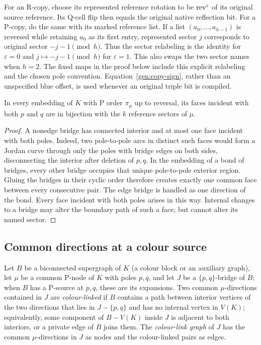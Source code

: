 For an R-copy, choose its represented reference rotation to be
$\operatorname{rev}^{\varepsilon}$ of its original source reference.  Its Q-cell flip
then equals the original native reflection bit.  For a P-copy, do the
same with its marked reference list.  If a list
$(a_0,\ldots,a_{h-1})$ is reversed while retaining $a_0$ as its first
entry, represented sector $j$ corresponds to original sector
$-j-1\pmod h$.  Thus the sector relabeling is the identity for
$\varepsilon=0$ and $j\mapsto-j-1\pmod h$ for $\varepsilon=1$.
This also swaps the two sector names when $h=2$.  The fixed maps in the
proof below include this explicit relabeling and the chosen pole
convention.  Equation~\eqref{gen:copy-sign}, rather than an unspecified
blue offset, is used whenever an original triple bit is compiled.

\begin{lemma}
\label{gen:p-faces}
In every embedding of $K$ with P order $\pi_\mu$ up to reversal, its
faces incident with both $p$ and $q$ are in bijection with the $k$ reference
sectors of $\mu$.
\end{lemma}

\begin{proof}
A nonedge bridge has connected interior and at most one face incident with
both poles.  Indeed, two pole-to-pole arcs in distinct such faces would
form a Jordan curve through only the poles with bridge edges on both
sides, disconnecting the interior after deletion of $p,q$.  In the
embedding of a bond of bridges, every other bridge occupies that unique
pole-to-pole exterior region.  Gluing the bridges in their cyclic order
therefore creates exactly one common face between every consecutive pair.
The edge bridge is handled as one direction of the bond.  Every face
incident with both poles arises in this way.  Internal changes to a bridge
may alter the boundary path of such a face, but cannot alter its named
sector.
\end{proof}

\subsection{Common directions at a colour source}

Let $B$ be a biconnected supergraph of $K$ (a colour block or an auxiliary
graph), let $\mu$ be a common P-node of $K$ with poles $p,q$, and let $J$
be a $\{p,q\}$-bridge of $B$; when $B$ has a P-source at $p,q$, these are
its expansions.  Two common $\mu$-directions contained in $J$ are
\emph{colour-linked} if $B$ contains a path between interior vertices of
the two directions that lies in $J-\{p,q\}$ and has no internal vertex in
$V(K)$; equivalently, some component of $B-V(K)$ inside $J$ is adjacent to
both interiors, or a private edge of $B$ joins them.  The
\emph{colour-link graph} of $J$ has the common $\mu$-directions in $J$ as
nodes and the colour-linked pairs as edges.

